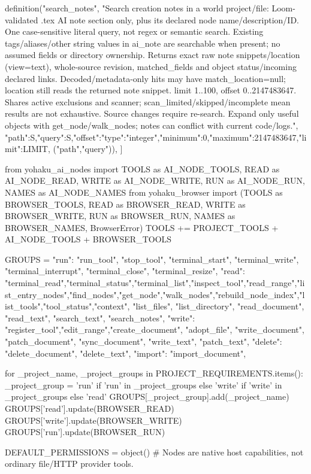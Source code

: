     definition("search_notes", "Search creation notes in a world project/file: Loom-validated .tex AI note section only, plus its declared node name/description/ID. One case-sensitive literal query, not regex or semantic search. Existing tags/aliases/other string values in ai_note are searchable when present; no assumed fields or directory ownership. Returns exact raw note snippets/location (view=text), whole-source revision, matched_fields and object status/incoming declared links. Decoded/metadata-only hits may have match_location=null; location still reads the returned note snippet. limit 1..100, offset 0..2147483647. Shares active exclusions and scanner; scan_limited/skipped/incomplete mean results are not exhaustive. Source changes require re-search. Expand only useful objects with get_node/walk_nodes; notes can conflict with current code/logs.", {"path":S,"query":S,"offset":{"type":"integer","minimum":0,"maximum":2147483647},"limit":LIMIT}, ("path","query")),
]

from yohaku_ai_nodes import TOOLS as AI_NODE_TOOLS, READ as AI_NODE_READ, WRITE as AI_NODE_WRITE, RUN as AI_NODE_RUN, NAMES as AI_NODE_NAMES
from yohaku_browser import (TOOLS as BROWSER_TOOLS, READ as BROWSER_READ, WRITE as BROWSER_WRITE,
    RUN as BROWSER_RUN, NAMES as BROWSER_NAMES, BrowserError)
TOOLS += PROJECT_TOOLS + AI_NODE_TOOLS + BROWSER_TOOLS

GROUPS = {
    "run": {"run_tool", "stop_tool", "terminal_start", "terminal_write", "terminal_interrupt", "terminal_close", "terminal_resize"},
    "read": {"terminal_read","terminal_status","terminal_list","inspect_tool","read_range","list_entry_nodes","find_nodes","get_node","walk_nodes","rebuild_node_index","list_tools","tool_status","context", "list_files", "list_directory", "read_document", "read_text", "search_text", "search_notes"},
    "write": {"register_tool","edit_range","create_document", "adopt_file", "write_document", "patch_document", "sync_document", "write_text", "patch_text"},
    "delete": {"delete_document", "delete_text"},
    "import": {"import_document"},
}

for _project_name, _project_groups in PROJECT_REQUIREMENTS.items():
    _project_group = 'run' if 'run' in _project_groups else 'write' if 'write' in _project_groups else 'read'
    GROUPS[_project_group].add(_project_name)
GROUPS['read'].update(BROWSER_READ)
GROUPS['write'].update(BROWSER_WRITE)
GROUPS['run'].update(BROWSER_RUN)

DEFAULT_PERMISSIONS = object()
# Nodes are native host capabilities, not ordinary file/HTTP provider tools.


